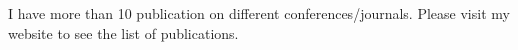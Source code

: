 \begin{resume}
I have more than 10 publication on different conferences/journals. Please visit my website to see the list of publications.
%
%
%
%
%
%
%
%
%
%






\begin{formatb}
  \\
  \body\\
\end{formatb}



\end{resume}
